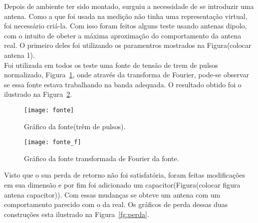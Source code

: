 Depois de ambiente ter sido montado, surguiu a necessidade de se introduzir uma antena. Como a que foi usada na medição não tinha uma representação virtual, foi necessário criá-la. Com isso foram feitos alguns teste usando antenas dipolo, com o intuito de obeter a máxima aproximação do comportamento da antena real. O primeiro deles foi utilizando os paramentros mostrados na Figura(colocar antena 1).\\

Foi utilizada em todos os teste uma fonte de tensão de trem de pulsos normalizado, Figura~\ref{fg:fonte}, onde através da transforma de Fourier, pode-se observar se essa fonte estava trabalhando na banda adequada. O resultado obtido foi o ilustrado na Figura~\ref{fg:fonte_f}.\\
\begin{figure}[ht!]
	\centering
	\texttt{[image: fonte]}
	\caption{Gráfico da fonte(trêm de pulsos).}
	\label{fg:fonte}
\end{figure}
\begin{figure}[ht!]
	\centering
	\texttt{[image: fonte\_f]}
	\caption{Gráfico da fonte transformada de Fourier da fonte.}
	\label{fg:fonte_f}
\end{figure}
 Visto que o sua perda de retorno não foi satisfatória, foram feitas modificações em sua dimensão e por fim foi adicionado um  capacitor(Figura(colocar figura antena capacitor)). Com essas mudanças se obteve um antena com um comportamento parecido com o da real. Os gráficos de perda dessas duas construções esta ilustrado na Figura~\ref{fg:perda}.  





